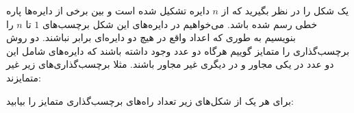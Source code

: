\p
یک شکل را در نظر بگیرید که از $n$ دایره تشکیل شده است و بین برخی از دایره‌ها پاره خطی رسم شده باشد. می‌خواهیم در دایره‌های این شکل برچسب‌های $1$ تا $n$ را بنویسیم 
به طوری که اعداد واقع در هیچ دو دایره‌ای برابر نباشند. دو روش برچسب‌گذاری را متمایز گوییم هرگاه دو عدد وجود داشته باشند که دایره‌های شامل این دو عدد در یکی مجاور و در دیگری غیر مجاور باشند.
مثلا برچسب‌گذاری‌های زیر غیر متمایزند:

برای هر یک از شکل‌های زیر تعداد راه‌های برچسب‌گذاری متمایز را بیابید:


